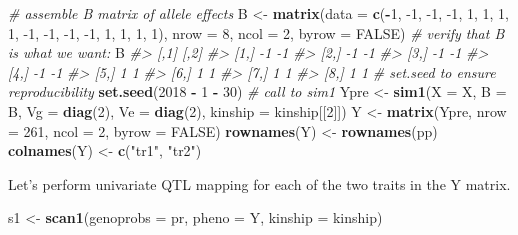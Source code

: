 \documentclass[oneside]{book}\usepackage[]{graphicx}\usepackage[]{color}
\newenvironment{Shaded}{\begin{snugshade}}{\end{snugshade}}
\newcommand{\CommentTok}[1]{\textcolor[rgb]{0.56,0.35,0.01}{\textit{#1}}}
\newcommand{\DataTypeTok}[1]{\textcolor[rgb]{0.13,0.29,0.53}{#1}}
\newcommand{\DecValTok}[1]{\textcolor[rgb]{0.00,0.00,0.81}{#1}}
\newcommand{\KeywordTok}[1]{\textcolor[rgb]{0.13,0.29,0.53}{\textbf{#1}}}
\newcommand{\NormalTok}[1]{#1}
\newcommand{\OperatorTok}[1]{\textcolor[rgb]{0.81,0.36,0.00}{\textbf{#1}}}
\newcommand{\OtherTok}[1]{\textcolor[rgb]{0.56,0.35,0.01}{#1}}
\newcommand{\StringTok}[1]{\textcolor[rgb]{0.31,0.60,0.02}{#1}}
\begin{document}
\begin{Shaded}
\begin{Highlighting}[]
\CommentTok{# assemble B matrix of allele effects}
\NormalTok{B <-}\StringTok{ }\KeywordTok{matrix}\NormalTok{(}\DataTypeTok{data =} \KeywordTok{c}\NormalTok{(}\OperatorTok{-}\DecValTok{1}\NormalTok{, }\DecValTok{-1}\NormalTok{, }\DecValTok{-1}\NormalTok{, }\DecValTok{-1}\NormalTok{, }\DecValTok{1}\NormalTok{, }\DecValTok{1}\NormalTok{, }\DecValTok{1}\NormalTok{, }\DecValTok{1}\NormalTok{, }\DecValTok{-1}\NormalTok{, }\DecValTok{-1}\NormalTok{, }\DecValTok{-1}\NormalTok{, }
    \DecValTok{-1}\NormalTok{, }\DecValTok{1}\NormalTok{, }\DecValTok{1}\NormalTok{, }\DecValTok{1}\NormalTok{, }\DecValTok{1}\NormalTok{), }\DataTypeTok{nrow =} \DecValTok{8}\NormalTok{, }\DataTypeTok{ncol =} \DecValTok{2}\NormalTok{, }\DataTypeTok{byrow =} \OtherTok{FALSE}\NormalTok{)}
\CommentTok{# verify that B is what we want:}
\NormalTok{B}
\CommentTok{#>      [,1] [,2]}
\CommentTok{#> [1,]   -1   -1}
\CommentTok{#> [2,]   -1   -1}
\CommentTok{#> [3,]   -1   -1}
\CommentTok{#> [4,]   -1   -1}
\CommentTok{#> [5,]    1    1}
\CommentTok{#> [6,]    1    1}
\CommentTok{#> [7,]    1    1}
\CommentTok{#> [8,]    1    1}
\CommentTok{# set.seed to ensure reproducibility}
\KeywordTok{set.seed}\NormalTok{(}\DecValTok{2018} \OperatorTok{-}\StringTok{ }\DecValTok{1} \OperatorTok{-}\StringTok{ }\DecValTok{30}\NormalTok{)}
\CommentTok{# call to sim1}
\NormalTok{Ypre <-}\StringTok{ }\KeywordTok{sim1}\NormalTok{(}\DataTypeTok{X =}\NormalTok{ X, }\DataTypeTok{B =}\NormalTok{ B, }\DataTypeTok{Vg =} \KeywordTok{diag}\NormalTok{(}\DecValTok{2}\NormalTok{), }\DataTypeTok{Ve =} \KeywordTok{diag}\NormalTok{(}\DecValTok{2}\NormalTok{), }\DataTypeTok{kinship =}\NormalTok{ kinship[[}\DecValTok{2}\NormalTok{]])}
\NormalTok{Y <-}\StringTok{ }\KeywordTok{matrix}\NormalTok{(Ypre, }\DataTypeTok{nrow =} \DecValTok{261}\NormalTok{, }\DataTypeTok{ncol =} \DecValTok{2}\NormalTok{, }\DataTypeTok{byrow =} \OtherTok{FALSE}\NormalTok{)}
\KeywordTok{rownames}\NormalTok{(Y) <-}\StringTok{ }\KeywordTok{rownames}\NormalTok{(pp)}
\KeywordTok{colnames}\NormalTok{(Y) <-}\StringTok{ }\KeywordTok{c}\NormalTok{(}\StringTok{"tr1"}\NormalTok{, }\StringTok{"tr2"}\NormalTok{)}
\end{Highlighting}
\end{Shaded}

Let's perform univariate QTL mapping for each of the two traits in the Y
matrix.

\begin{Shaded}
\begin{Highlighting}[]
\NormalTok{s1 <-}\StringTok{ }\KeywordTok{scan1}\NormalTok{(}\DataTypeTok{genoprobs =}\NormalTok{ pr, }\DataTypeTok{pheno =}\NormalTok{ Y, }\DataTypeTok{kinship =}\NormalTok{ kinship)}
\end{Highlighting}
\end{Shaded}
\end{document}
